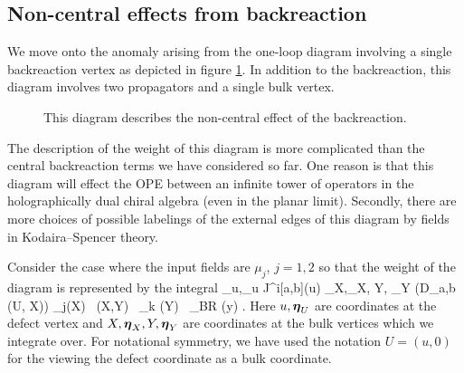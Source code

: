 \documentclass[../main.tex]{subfiles}
\begin{document}
\subsection{Non-central effects from backreaction}

We move onto the anomaly arising from the one-loop diagram involving a single backreaction vertex as depicted in figure \ref{fig:oneloopsinglebr}.
In addition to the backreaction, this diagram involves two propagators and a single bulk vertex.

\begin{figure}
	\label{fig:oneloopsinglebr}
	\caption{This diagram describes the non-central effect of the backreaction.}
\end{figure}

The description of the weight of this diagram is more complicated than the central backreaction terms we have considered so far.
One reason is that this diagram will effect the OPE between an infinite tower of operators in the holographically dual chiral algebra (even in the planar limit).
Secondly, there are more choices of possible labelings of the external edges of this diagram by fields in Kodaira--Spencer theory.

Consider the case where the input fields are $\mu_j$, $j=1,2$ so that the weight of the diagram is represented by the integral
\beqn
\int_{u,\eta_u} \til J^i[a,b](u) \int_{X,\bfeta_X, Y, \bfeta_Y} \left(D_{a,b} \bP (U, X)\right) \mu_j(X) \,  \bP (X,Y) \, \mu_k (Y) \, \mu_{BR} (y)  .
\eeqn
Here $u,\boldsymbol\eta_U$ are coordinates at the defect vertex and $X,\boldsymbol\eta_X,Y,\boldsymbol\eta_Y$ are coordinates at the bulk vertices which we integrate over.
For notational symmetry, we have used the notation $U = (u,0)$ for the viewing the defect coordinate as a bulk coordinate.
\end{document}
